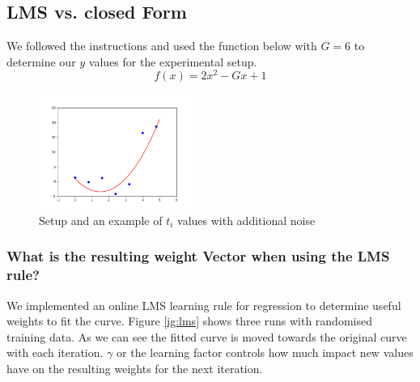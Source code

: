 \subsection{LMS vs. closed Form}
We followed the instructions and used the  function below with $G = 6$ to determine our $y$ values for the experimental setup.
\begin{equation}
f(x) = 2x^2 - Gx +1
\end{equation}


\begin{figure}[!h]
\begin{center}
\centering
\includegraphics[width=5cm]{setup.png}
\end{center}
\caption{ Setup and an example of $t_i$ values with additional noise}
\end{figure}

\subsubsection{What is the resulting weight Vector when using the LMS rule?}

We implemented an online LMS learning rule for regression to determine useful weights to fit the curve. Figure \ref{ig:lms} shows three runs with randomised training data. As we can see the fitted curve is moved towards the original curve with each iteration. $\gamma$ or the learning factor controls how much impact new values have on the resulting weights for the next iteration. 

